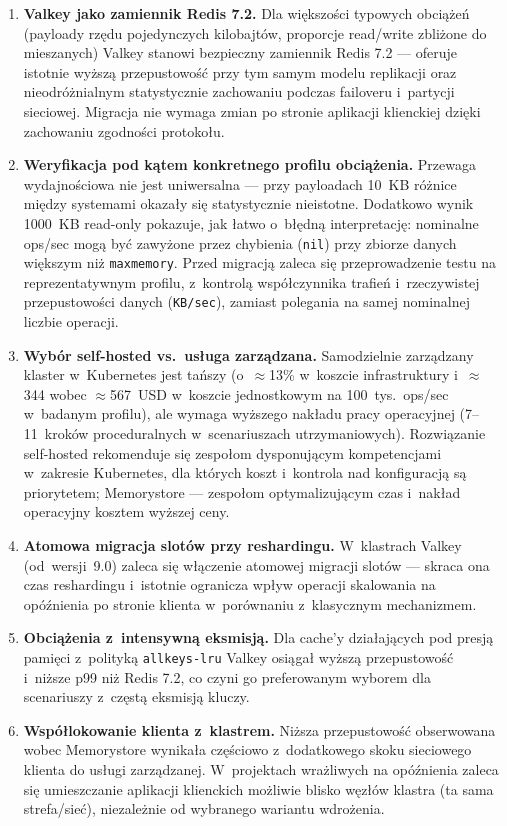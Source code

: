 \begin{enumerate}
    \item \textbf{Valkey jako zamiennik Redis 7.2.} Dla większości typowych obciążeń (payloady rzędu pojedynczych kilobajtów, proporcje read/write zbliżone do mieszanych) Valkey stanowi bezpieczny zamiennik Redis 7.2 --- oferuje istotnie wyższą przepustowość przy tym samym modelu replikacji oraz nieodróżnialnym statystycznie zachowaniu podczas failoveru i~partycji sieciowej. Migracja nie wymaga zmian po stronie aplikacji klienckiej dzięki zachowaniu zgodności protokołu.
    \item \textbf{Weryfikacja pod kątem konkretnego profilu obciążenia.} Przewaga wydajnościowa nie jest uniwersalna --- przy payloadach 10~KB różnice między systemami okazały się statystycznie nieistotne. Dodatkowo wynik 1000~KB read-only pokazuje, jak łatwo o~błędną interpretację: nominalne ops/sec mogą być zawyżone przez chybienia (\texttt{nil}) przy zbiorze danych większym niż \texttt{maxmemory}. Przed migracją zaleca się przeprowadzenie testu na reprezentatywnym profilu, z~kontrolą współczynnika trafień i~rzeczywistej przepustowości danych (\texttt{KB/sec}), zamiast polegania na samej nominalnej liczbie operacji.
    \item \textbf{Wybór self-hosted vs.\ usługa zarządzana.} Samodzielnie zarządzany klaster w~Kubernetes jest tańszy (o~$\approx$13\% w~koszcie infrastruktury i~$\approx$344 wobec $\approx$567~USD w~koszcie jednostkowym na 100~tys.\ ops/sec w~badanym profilu), ale wymaga wyższego nakładu pracy operacyjnej (7--11~kroków proceduralnych w~scenariuszach utrzymaniowych). Rozwiązanie self-hosted rekomenduje się zespołom dysponującym kompetencjami w~zakresie Kubernetes, dla których koszt i~kontrola nad konfiguracją są priorytetem; Memorystore --- zespołom optymalizującym czas i~nakład operacyjny kosztem wyższej ceny.
    \item \textbf{Atomowa migracja slotów przy reshardingu.} W~klastrach Valkey (od~wersji~9.0) zaleca się włączenie atomowej migracji slotów --- skraca ona czas reshardingu i~istotnie ogranicza wpływ operacji skalowania na opóźnienia po stronie klienta w~porównaniu z~klasycznym mechanizmem.
    \item \textbf{Obciążenia z~intensywną eksmisją.} Dla cache'y działających pod presją pamięci z~polityką \texttt{allkeys-lru} Valkey osiągał wyższą przepustowość i~niższe p99 niż Redis 7.2, co czyni go preferowanym wyborem dla scenariuszy z~częstą eksmisją kluczy.
    \item \textbf{Współlokowanie klienta z~klastrem.} Niższa przepustowość obserwowana wobec Memorystore wynikała częściowo z~dodatkowego skoku sieciowego klienta do usługi zarządzanej. W~projektach wrażliwych na opóźnienia zaleca się umieszczanie aplikacji klienckich możliwie blisko węzłów klastra (ta sama strefa/sieć), niezależnie od wybranego wariantu wdrożenia.
\end{enumerate}

